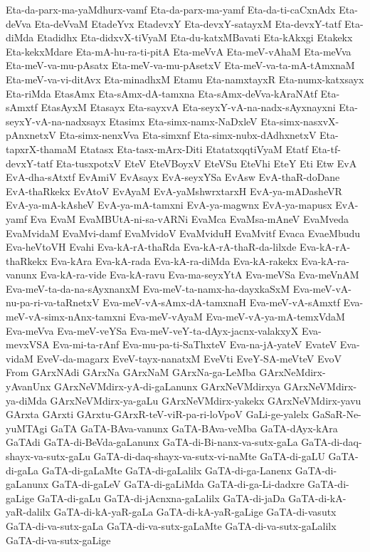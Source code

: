 {Eta-da-parx-ma-yaMdhurx-vamf
Eta-da-parx-ma-yamf
Eta-da-ti-caCxnAdx
Eta-deVva
Eta-deVvaM
EtadeYvx
EtadevxY
Eta-devxY-satayxM
Eta-devxY-tatf
Eta-diMda
Etadidhx
Eta-didxvX-tiVyaM
Eta-du-katxMBavati
Eta-kAkxgi
Etakekx
Eta-kekxMdare
Eta-mA-hu-ra-ti-pitA
Eta-meVvA
Eta-meV-vAhaM
Eta-meVva
Eta-meV-va-mu-pAsatx
Eta-meV-va-mu-pAsetxV
Eta-meV-va-ta-mA-tAmxnaM
Eta-meV-va-vi-ditAvx
Eta-minadhxM
Etamu
Eta-namxtayxR
Eta-numx-katxsayx
Eta-riMda
EtasAmx
Eta-sAmx-dA-tamxna
Eta-sAmx-deVva-kAraNAtf
Eta-sAmxtf
EtasAyxM
Etasayx
Eta-sayxvA
Eta-seyxY-vA-na-nadx-sAyxnayxni
Eta-seyxY-vA-na-nadxsayx
Etasimx
Eta-simx-namx-NaDxleV
Eta-simx-nasxvX-pAnxnetxV
Eta-simx-nenxVva
Eta-simxnf
Eta-simx-nubx-dAdhxnetxV
Eta-tapxrX-thamaM
Etatasx
Eta-tasx-mArx-Diti
EtatatxqqtiVyaM
Etatf
Eta-tf-devxY-tatf
Eta-tusxpotxV
EteV
EteVBoyxV
EteVSu
EteVhi
EteY
Eti
Etw
EvA
EvA-dha-sAtxtf
EvAmiV
EvAsayx
EvA-seyxYSa
EvAsw
EvA-thaR-doDane
EvA-thaRkekx
EvAtoV
EvAyaM
EvA-yaMshwrxtarxH
EvA-ya-mADasheVR
EvA-ya-mA-kAsheV
EvA-ya-mA-tamxni
EvA-ya-magwnx
EvA-ya-mapusx
EvA-yamf
Eva
EvaM
EvaMBUtA-ni-sa-vARNi
EvaMca
EvaMsa-mAneV
EvaMveda
EvaMvidaM
EvaMvi-damf
EvaMvidoV
EvaMviduH
EvaMvitf
Evaca
EvaeMbudu
Eva-heVtoVH
Evahi
Eva-kA-rA-thaRda
Eva-kA-rA-thaR-da-lilxde
Eva-kA-rA-thaRkekx
Eva-kAra
Eva-kA-rada
Eva-kA-ra-diMda
Eva-kA-rakekx
Eva-kA-ra-vanunx
Eva-kA-ra-vide
Eva-kA-ravu
Eva-ma-seyxYtA
Eva-meVSa
Eva-meVnAM
Eva-meV-ta-da-na-sAyxnanxM
Eva-meV-ta-namx-ha-dayxkaSxM
Eva-meV-vA-nu-pa-ri-va-taRnetxV
Eva-meV-vA-sAmx-dA-tamxnaH
Eva-meV-vA-sAmxtf
Eva-meV-vA-simx-nAnx-tamxni
Eva-meV-vAyaM
Eva-meV-vA-ya-mA-temxVdaM
Eva-meVva
Eva-meV-veYSa
Eva-meV-veY-ta-dAyx-jacnx-valakxyX
Eva-mevxVSA
Eva-mi-ta-rAnf
Eva-mu-pa-ti-SaThxteV
Eva-na-jA-yateV
EvateV
Eva-vidaM
EveV-da-magarx
EveV-tayx-nanatxM
EveVti
EveY-SA-meVteV
EvoV
From
GArxNAdi
GArxNa
GArxNaM
GArxNa-ga-LeMba
GArxNeMdirx-yAvanUnx
GArxNeVMdirx-yA-di-gaLanunx
GArxNeVMdirxya
GArxNeVMdirx-ya-diMda
GArxNeVMdirx-ya-gaLu
GArxNeVMdirx-yakekx
GArxNeVMdirx-yavu
GArxta
GArxti
GArxtu-GArxR-teV-viR-pa-ri-loVpoV
GaLi-ge-yalelx
GaSaR-Ne-yuMTAgi
GaTA
GaTA-BAva-vanunx
GaTA-BAva-veMba
GaTA-dAyx-kAra
GaTAdi
GaTA-di-BeVda-gaLanunx
GaTA-di-Bi-nanx-va-sutx-gaLa
GaTA-di-daq-shayx-va-sutx-gaLu
GaTA-di-daq-shayx-va-sutx-vi-naMte
GaTA-di-gaLU
GaTA-di-gaLa
GaTA-di-gaLaMte
GaTA-di-gaLalilx
GaTA-di-ga-Lanenx
GaTA-di-gaLanunx
GaTA-di-gaLeV
GaTA-di-gaLiMda
GaTA-di-ga-Li-dadxre
GaTA-di-gaLige
GaTA-di-gaLu
GaTA-di-jAcnxna-gaLalilx
GaTA-di-jaDa
GaTA-di-kA-yaR-dalilx
GaTA-di-kA-yaR-gaLa
GaTA-di-kA-yaR-gaLige
GaTA-di-vasutx
GaTA-di-va-sutx-gaLa
GaTA-di-va-sutx-gaLaMte
GaTA-di-va-sutx-gaLalilx
GaTA-di-va-sutx-gaLige
}
